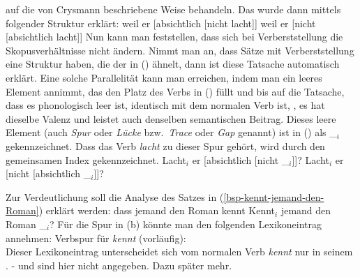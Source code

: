 \begin{enumerate}
{auf die von Crysmann beschriebene Weise behandeln.%
}
Das wurde dann mittels folgender Struktur erklärt:
\eal
\label{bsp-absichtlich-nicht-anal}
\ex weil er [absichtlich [nicht lacht]]
\ex weil er [nicht [absichtlich lacht]]
\zl
Nun kann man feststellen, dass sich bei Verberststellung die Skopusverhältnisse nicht ändern.
Nimmt man an, dass Sätze mit Verberststellung eine Struktur haben, die der in ()
ähnelt, dann ist diese Tatsache automatisch erklärt. Eine solche Parallelität kann man
erreichen, indem man ein leeres Element annimmt, das den Platz des Verbs in () füllt
und bis auf die Tatsache, dass es phonologisch leer ist, identisch
mit dem normalen Verb ist, \dash, es hat dieselbe Valenz und leistet auch denselben semantischen
Beitrag. Dieses leere Element (auch \emph{Spur} oder \emph{Lücke}
bzw.\ \emph{Trace} oder \emph{Gap} genannt) ist in () als \_$_i$ gekennzeichnet. 
Dass das Verb \emph{lacht} zu dieser Spur gehört, wird durch den gemeinsamen
Index gekennzeichnet.
\eal
\label{bsp-absichtlich-nicht-anal-v1}
\ex Lacht$_i$ er [absichtlich [nicht \_$_i$]]?
\ex Lacht$_i$ er [nicht [absichtlich \_$_i$]]?
\zl{}
\nocite{Hoehle88a,Hoehle97a}
\end{enumerate}
Zur Verdeutlichung soll die Analyse des Satzes in (\ref{bsp-kennt-jemand-den-Roman}) erklärt werden:
\eal
\ex dass jemand den Roman kennt\label{bsp-dass-jemand-den-Roman-kennt}
\ex Kennt$_i$ jemand den Roman \_$_i$?\label{bsp-kennt-jemand-den-Roman}
\zl
Für die Spur in (b) könnte man den folgenden Lexikoneintrag annehmen:
\eas
Verbspur für \emph{kennt} (vorläufig):\\
\zs
Dieser Lexikoneintrag unterscheidet sich vom normalen Verb \emph{kennt} nur in seinem
\phonw. \argst- und \sprw sind hier nicht angegeben. Dazu später mehr.


